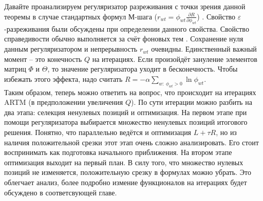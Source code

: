 \documentclass[12pt]{article}
\begin{document}
Давайте проанализируем регуляризатор разреживания с точки зрения данной теоремы в случае стандартных формул М-шага ($r_{wt} = \phi_{wt}\frac{\partial{R}}{\partial{\phi_{wt}}}$) . Свойство $\varepsilon$-разреживания были обсуждены при определении данного свойства. Свойство справедивости обычно выполняется за счёт фоновых тем \cite{artmdef2} . Сохранение нуля данным регуляризатором и непрерывность $r_{wt}$ очевидны. Единственный важный момент -- это конечность $Q$ на итерациях. Если произойдёт зануление элементов матриц $\Phi$ и $\Theta$, то значение регуляризатора уходит в бесконечность. Чтобы избежать этого эффекта, надо считать $R = -\alpha \sum\limits_{w\colon~\phi_{wt} > 0} \ln\phi_{wt}$.\\
Таким образом, теперь можно ответить на вопрос, что происходит на итерациях ARTM (в предположении увеличения $Q$). По сути итерации можно разбить на два этапа: селекция ненулевых позиций и оптимизация. На первом этапе при помощи регуляризатора выбирается множество ненулевых позиций итогового решения. Понятно, что параллельно ведётся и оптимизация $L + \tau R$, но из наличия положительной срезки этот этап очень сложно анализировать. Его стоит воспринимать как подготовка начального приближения. На втором этапе оптимизация выходит на первый план. В силу того, что множество нулевых позиций не изменяется, положительную срезку в формулах можно убрать. Это облегчает анализ, более подробно измение функционалов на итерациях будет обсуждено в соответсвующей главе.
\end{document}
